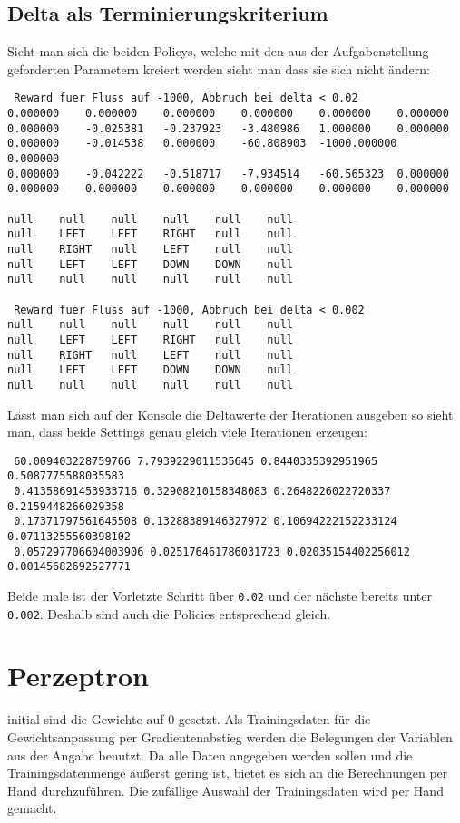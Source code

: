 \documentclass[a4paper]{article}
\begin{document}
\subsection{Delta als Terminierungskriterium}
Sieht man sich die beiden Policys, welche mit den aus der Aufgabenstellung geforderten Parametern kreiert werden sieht man dass sie sich nicht ändern:
\begin{lstlisting}
 Reward fuer Fluss auf -1000, Abbruch bei delta < 0.02
0.000000 	0.000000 	0.000000 	0.000000 	0.000000 	0.000000 	
0.000000 	-0.025381 	-0.237923 	-3.480986 	1.000000 	0.000000 	
0.000000 	-0.014538 	0.000000 	-60.808903 	-1000.000000 	0.000000 	
0.000000 	-0.042222 	-0.518717 	-7.934514 	-60.565323 	0.000000 	
0.000000 	0.000000 	0.000000 	0.000000 	0.000000 	0.000000 	

null	null	null	null	null	null	
null	LEFT	LEFT	RIGHT	null	null	
null	RIGHT	null	LEFT	null	null	
null	LEFT	LEFT	DOWN	DOWN	null	
null	null	null	null	null	null	

 Reward fuer Fluss auf -1000, Abbruch bei delta < 0.002
null	null	null	null	null	null	
null	LEFT	LEFT	RIGHT	null	null	
null	RIGHT	null	LEFT	null	null	
null	LEFT	LEFT	DOWN	DOWN	null	
null	null	null	null	null	null	

\end{lstlisting}
Lässt man sich auf der Konsole die Deltawerte der Iterationen ausgeben so sieht man, dass beide Settings genau gleich viele Iterationen erzeugen:
\begin{lstlisting}
 60.009403228759766 7.7939229011535645 0.8440335392951965 0.5087775588035583
 0.41358691453933716 0.32908210158348083 0.2648226022720337 0.2159448266029358
 0.17371797561645508 0.13288389146327972 0.10694222152233124 0.07113255560398102
 0.057297706604003906 0.025176461786031723 0.02035154402256012 0.00145682692527771
\end{lstlisting}

Beide male ist der Vorletzte Schritt über \texttt{0.02} und der nächste bereits unter \texttt{0.002}. Deshalb sind auch die Policies entsprechend gleich.
\lstset{numbers=left}
\section{Perzeptron}
initial sind die Gewichte auf 0 gesetzt. Als Trainingsdaten für die Gewichtsanpassung per Gradientenabstieg werden die Belegungen der Variablen aus der Angabe benutzt. Da alle Daten angegeben werden sollen und die Trainingsdatenmenge äußerst gering ist, bietet es sich an die Berechnungen per Hand durchzuführen. Die zufällige Auswahl der Trainingsdaten wird per Hand gemacht.
\end{document}
